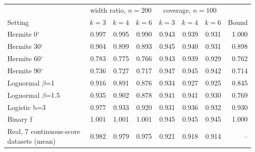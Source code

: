 \begin{tabular}{lrrrrrrr}
\toprule
 & \multicolumn{3}{c}{width ratio, $n{=}200$} & \multicolumn{3}{c}{coverage, $n{=}100$} & \\
Setting & $k{=}3$ & $k{=}4$ & $k{=}6$ & $k{=}3$ & $k{=}4$ & $k{=}6$ & Bound \\
\midrule
Hermite 0$^\circ$ & 0.997 & 0.995 & 0.990 & 0.943 & 0.939 & 0.931 & 1.000 \\
Hermite 30$^\circ$ & 0.904 & 0.899 & 0.893 & 0.945 & 0.940 & 0.931 & 0.898 \\
Hermite 60$^\circ$ & 0.783 & 0.775 & 0.766 & 0.943 & 0.939 & 0.929 & 0.762 \\
Hermite 90$^\circ$ & 0.736 & 0.727 & 0.717 & 0.947 & 0.945 & 0.942 & 0.714 \\
Lognormal $\beta$=1 & 0.916 & 0.891 & 0.876 & 0.934 & 0.927 & 0.925 & 0.845 \\
Lognormal $\beta$=1.5 & 0.935 & 0.902 & 0.878 & 0.941 & 0.941 & 0.930 & 0.769 \\
Logistic b=3 & 0.977 & 0.933 & 0.920 & 0.931 & 0.936 & 0.932 & 0.930 \\
Binary f & 1.001 & 1.001 & 1.001 & 0.945 & 0.945 & 0.945 & 1.000 \\
\midrule
Real, 7 continuous-score datasets (mean) & 0.982 & 0.979 & 0.975 & 0.921 & 0.918 & 0.914 & -- \\
\bottomrule
\end{tabular}